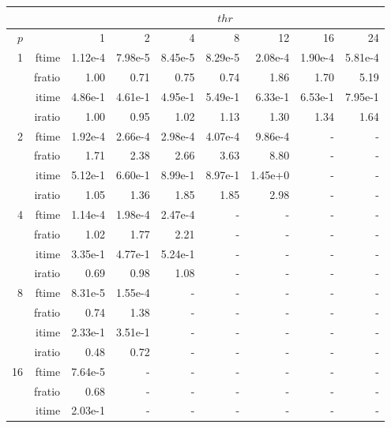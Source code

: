 \documentclass[a4paper]{article}
\begin{document}
\begin{table}[htbp]
\begin{center}
\begin{small}
\begin{tabular}{|r|r|r|r|r|r|r|r|r|}
\hline 
     &  & \multicolumn{7}{c|}{$thr$} \\ \hline
    $p$  &  & 1           & 2    & 4    & 8    & 12   & 16    & 24  \\ \hline\hline
   1 &  ftime &   1.12e-4 &   7.98e-5 &   8.45e-5 &   8.29e-5 &   2.08e-4 &   1.90e-4 &   5.81e-4 \\
     &  fratio &   1.00 &   0.71 &   0.75 &   0.74 &   1.86 &   1.70 &   5.19 \\
     &  itime &   4.86e-1 &   4.61e-1 &   4.95e-1 &   5.49e-1 &   6.33e-1 &   6.53e-1 &   7.95e-1 \\
     &  iratio &   1.00 &   0.95 &   1.02 &   1.13 &   1.30 &   1.34 &   1.64 \\ \hline
   2 &  ftime &   1.92e-4 &   2.66e-4 &   2.98e-4 &   4.07e-4 &   9.86e-4 &  - &  - \\
     &  fratio &   1.71 &   2.38 &   2.66 &   3.63 &   8.80 &  - &  - \\
     &  itime &   5.12e-1 &   6.60e-1 &   8.99e-1 &   8.97e-1 &   1.45e+0 &  - &  - \\
     &  iratio &   1.05 &   1.36 &   1.85 &   1.85 &   2.98 &  - &  - \\\hline
   4 &  ftime &   1.14e-4 &   1.98e-4 &   2.47e-4 &  - &  - &  - &  - \\
     &  fratio &   1.02 &   1.77 &   2.21 &  - &  - &  - &  - \\
     &  itime &   3.35e-1 &   4.77e-1 &   5.24e-1 &  - &  - &  - &  - \\
     &  iratio &   0.69 &   0.98 &   1.08 &  - &  - &  - &  - \\ \hline
   8 &  ftime &   8.31e-5 &   1.55e-4 &  - &  - &  - &  - &  - \\
     &  fratio &   0.74 &   1.38 &  - &  - &  - &  - &  - \\
     &  itime &   2.33e-1 &   3.51e-1 &  - &  - &  - &  - &  - \\
     &  iratio &   0.48 &   0.72 &  - &  - &  - &  - &  - \\ \hline
  16 &  ftime &   7.64e-5 &  - &  - &  - &  - &  - &  - \\
     &  fratio &   0.68 &  - &  - &  - &  - &  - &  - \\
     &  itime &   2.03e-1 &  - &  - &  - &  - &  - &  - \\

\end{tabular}
\end{small}
\end{center}
\end{table}
\end{document}
